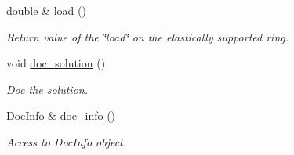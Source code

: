 \begin{DoxyCompactItemize}
\item 
double \& \hyperlink{classRefineableFishPoissonProblem_a20702e8945d442c9597348b550da14e4}{load} ()
\begin{DoxyCompactList}\small\item\em Return value of the \char`\"{}load\char`\"{} on the elastically supported ring. \end{DoxyCompactList}\item 
void \hyperlink{classRefineableFishPoissonProblem_a6db25ff0bd3014aa531d9f0e8b385beb}{doc\+\_\+solution} ()
\begin{DoxyCompactList}\small\item\em Doc the solution. \end{DoxyCompactList}\item 
Doc\+Info \& \hyperlink{classRefineableFishPoissonProblem_a093f5963e63746843c33ca444a205333}{doc\+\_\+info} ()
\begin{DoxyCompactList}\small\item\em Access to Doc\+Info object. \end{DoxyCompactList}\end{DoxyCompactItemize}
